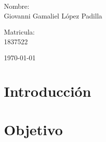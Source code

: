 \documentclass[reprint,amsmath,amssymb,aps,]{revtex4-2}
\begin{document}
\begin{titlepage}
\begin{center}
\begin{minipage}{0.6\linewidth}
\vspace{0.5cm}
\changefontsizes{14pt}
Nombre:\\
Giovanni Gamaliel López Padilla\\
\end{minipage}
\begin{minipage}{0.2\linewidth}
\changefontsizes{14pt}
Matricula:\\
1837522\\
\end{minipage}
\end{center}
\vspace{4cm}
\begin{flushright}
\today
\end{flushright}
\pagebreak
\end{titlepage}
\maketitle
\section{Introducción}
\section{Objetivo}
\end{document}
